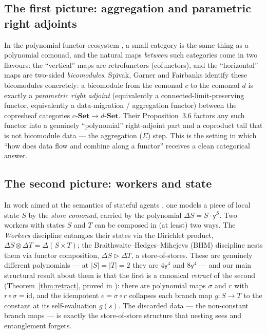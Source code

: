 \documentclass[11pt]{amsart}
\theoremstyle{plain}
\theoremstyle{definition}
\theoremstyle{gap}
\newcommand{\Set}{\mathbf{Set}}
\renewcommand{\lhd}{\vartriangleright}
\newcommand{\Store}[1]{\Delta #1}
\newcommand{\yon}{\mathsf{y}}
\begin{document}
\subsection*{The first picture: aggregation and parametric right adjoints}
In the polynomial-functor ecosystem \cite{NiuSpivak}, a small category is the same
thing as a polynomial comonad, and the natural maps \emph{between} such categories
come in two flavours: the ``vertical'' maps are retrofunctors (cofunctors), and the
``horizontal'' maps are two-sided \emph{bicomodules}. Spivak, Garner and Fairbanks
\cite{SGF} identify these bicomodules concretely: a bicomodule from the comonad $c$
to the comonad $d$ is exactly a \emph{parametric right adjoint} (equivalently a
connected-limit-preserving functor, equivalently a data-migration / aggregation
functor) between the copresheaf categories $c\text{-}\Set \to d\text{-}\Set$. Their
Proposition~3.6 factors any such functor into a genuinely ``polynomial'' right-adjoint
part and a coproduct tail that is not bicomodule data --- the aggregation ($\Sigma$)
step. This is the setting in which ``how does data flow and combine along a functor''
receives a clean categorical answer.

\subsection*{The second picture: workers and state}
In work aimed at the semantics of stateful agents \cite{workersProof}, one models a
piece of local state $S$ by the \emph{store comonad}, carried by the polynomial
$\Store{S}=S\cdot \yon^{S}$. Two workers with states $S$ and $T$ can be composed in
(at least) two ways. The \emph{Workers} discipline entangles their states via the
Dirichlet product, $\Store{S}\otimes\Store{T}=\Store{(S\times T)}$; the
Braithwaite--Hedges--Mihejevs (BHM) discipline nests them via functor composition,
$\Store{S}\lhd\Store{T}$, a store-of-stores. These are genuinely different
polynomials --- at $|S|=|T|=2$ they are $4\yon^{4}$ and $8\yon^{4}$ --- and our main
structural result about them is that the first is a canonical \emph{retract} of the
second (Theorem~\ref{thm:retract}, proved in \cite{workersProof}): there are
polynomial maps $\sigma$ and $r$ with $r\circ\sigma=\mathrm{id}$, and the idempotent
$e=\sigma\circ r$ collapses each branch map $g\colon S\to T$ to the constant at its
self-evaluation $g(s)$. The discarded data --- the non-constant branch maps --- is
exactly the store-of-store structure that nesting sees and entanglement forgets.
\end{document}
